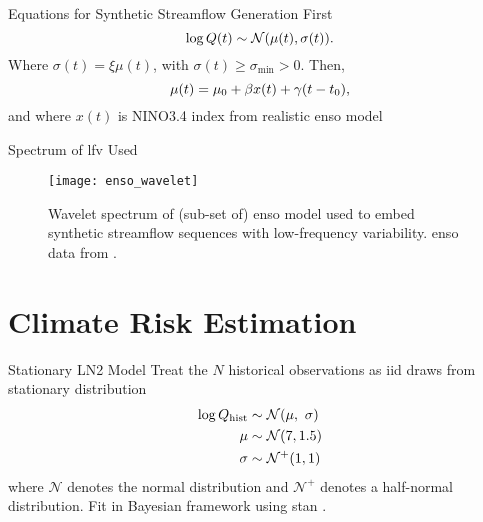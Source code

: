 \documentclass[
  10pt,     %
]{beamer}
\newcommand{\normal}{\mathcal{N}}
\begin{document}
\begin{frame}{Equations for Synthetic Streamflow Generation}
  First
  \begin{equation} \label{eq:lognormal}
    \log Q(t) \sim \normal \qty(\mu(t), \sigma(t)).
  \end{equation}
  Where $\sigma(t) = \xi \mu(t)$, with $\sigma(t) \geq \sigma_\text{min} > 0$.
  Then,
  \begin{equation}\label{eq:nino3}
    \mu(t) = \mu_0 + \beta x(t) + \gamma \qty(t - t_0),
  \end{equation}
  and where $x(t)$ is NINO3.4 index from realistic \gls{enso} model \citep{Zebiak:1987cl,Ramesh:2016hf}
\end{frame}

\begin{frame}{Spectrum of \gls{lfv} Used}
  \begin{figure}
    \texttt{[image: enso\_wavelet]}
    \caption{
      Wavelet spectrum of (sub-set of) \gls{enso} model used to embed synthetic streamflow sequences with low-frequency variability.
      \gls{enso} data from \citet{Ramesh:2016hf}.
    }
  \end{figure}
\end{frame}

\section{Climate Risk Estimation}

\begin{frame}{Stationary LN2 Model}
  Treat the $N$ historical observations as \gls{iid} draws from stationary distribution
  \begin{align}\label{eq:ln2-stationary}
    \begin{split}
      \log Q_\text{hist} & \sim \normal \qty(\mu, \ \sigma) \\
      \mu &\sim \normal \qty(7, 1.5) \\
      \sigma &\sim \normal^+ \qty(1, 1)
    \end{split}
  \end{align}
  where $\normal$ denotes the normal distribution and $\normal^+$ denotes a half-normal distribution.
  Fit in Bayesian framework using stan \citep{Carpenter:2017ke}.
\end{frame}
\end{document}
